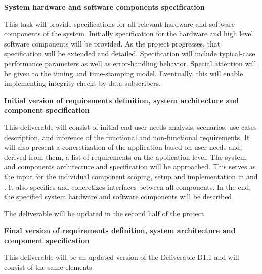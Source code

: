 {\begin{tasks}{\WPSpecificationNo}
\item  {\bf System hardware and software components specification}
     \label{task:wpspec:comp}

This task will provide specifications for all relevant hardware and software components of the system. Initially specification for the hardware and high level software components will be provided. As the project progresses, that specification will be extended and detailed. Specification will include typical-case performance parameters as well as error-handling behavior. Special attention will be given to the timing and time-stamping model. Eventually, this will enable implementing integrity checks by data subscribers.

\end{tasks}


\begin{deliverables}{\WPSpecificationNo}
\item {\bf Initial version of requirements definition, system architecture and component specification} 
	
This deliverable will consist of initial end-user needs analysis, scenarios, use cases description, and inference of the functional and non-functional requirements. It will also present a concretization of the application based on user needs and, derived from them, a list of requirements on the application level. The system and components architecture and specification will be approached. This serves as the input for the individual component scoping, setup and implementation in \WPVehicle and \WPCloud. It also specifies and concretizes interfaces between all components. In the end, the specified system hardware and software components will be described.

The deliverable will be updated in the second half of the project.

\item {\bf Final version of requirements definition, system architecture and component specification} 
	
This deliverable will be an updated version of the Deliverable D1.1 and will consist of the same elements.




\end{deliverables}}
